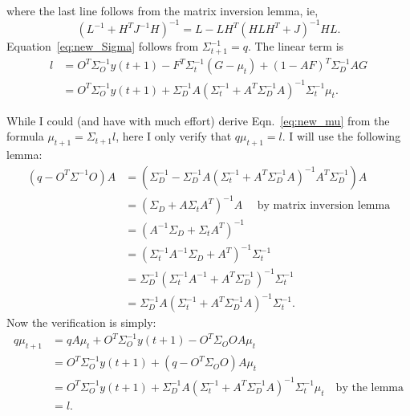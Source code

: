 \documentclass[12pt]{article}
\newcommand{\ti}[2]{{#1}{(#2)}}                         %
\begin{document}
where the last line follows from the matrix inversion lemma, ie,
\begin{equation*}
  (L^{-1} + H^T J^{-1} H)^{-1} = L - LH^T (HLH^T + J)^{-1} HL.
\end{equation*}
Equation~\eqref{eq:new_Sigma} follows from $\Sigma_{t+1}^{-1} = q$.
The linear term is
\begin{align*}
  l &= O^T\Sigma_O^{-1}y(t+1) - F^T \Sigma_t^{-1}(G-\mu_t) +
  (1-AF)^T\Sigma_D^{-1}AG \\
  &= O^T\Sigma_O^{-1}y(t+1) + \Sigma_D^{-1}A \left( \Sigma_t^{-1} +
    A^T \Sigma_D^{-1} A \right)^{-1} \Sigma_t^{-1} \mu_t.
\end{align*}

While I could (and have with much effort) derive
Eqn.~\eqref{eq:new_mu} from the formula $\mu_{t+1} = \Sigma_{t+1} l$,
here I only verify that $q \mu_{t+1} = l$.  I will use the following
lemma:
\begin{align*}
  (q-O^T\Sigma^{-1}O)A &= \left( \Sigma_D^{-1} - \Sigma_D^{-1} A (
    \Sigma_t^{-1} + A^T \Sigma_D^{-1} A)^{-1} A^T \Sigma_D^{-1}
  \right) A \\
  &= (\Sigma_D + A \Sigma_t A^T)^{-1} A \quad \text{ by matrix inversion
    lemma} \\
  &= (A^{-1} \Sigma_D + \Sigma_t A^T)^{-1} \\
  &= (\Sigma_t^{-1} A^{-1} \Sigma_D + A^T)^{-1} \Sigma_t^{-1}\\
  &= \Sigma_D^{-1} (\Sigma_t^{-1} A^{-1}  + A^T\Sigma_D^{-1})^{-1} \Sigma_t^{-1}\\
  &= \Sigma_D^{-1} A (\Sigma_t^{-1}  + A^T\Sigma_D^{-1} A)^{-1} \Sigma_t^{-1}.
\end{align*}
Now the verification is simply:
\begin{align*}
  q \mu_{t+1} &= qA\mu_t + O^T \Sigma_O^{-1} \ti{y}{t+1} - O^T
  \Sigma_O O A \mu_t \\
  &= O^T \Sigma_O^{-1} \ti{y}{t+1} + (q - O^T \Sigma_O O) A \mu_t \\
  &= O^T\Sigma_O^{-1}y(t+1) + \Sigma_D^{-1}A \left( \Sigma_t^{-1} +
    A^T \Sigma_D^{-1} A \right)^{-1} \Sigma_t^{-1} \mu_t \quad \text{
    by the lemma}\\
  &= l.
\end{align*}
\end{document}
